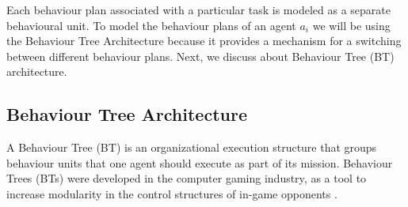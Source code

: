 \documentclass[journal]{IEEEtran}
\theoremstyle{definition}
\newcommand\patrizio[1]{\nb{Patrizio}{#1}}
\begin{document}
Each behaviour plan associated with a particular task is modeled as a separate behavioural unit.
To model the behaviour plans of an agent $a_i$ we will be using the Behaviour Tree Architecture because it provides a mechanism for a switching between different behaviour plans. Next, we discuss about Behaviour Tree (BT) architecture.

\subsection{Behaviour Tree Architecture}

A Behaviour Tree (BT) is an organizational execution structure that groups behaviour units that one agent should execute as part of its mission. Behaviour Trees (BTs) were developed in the computer gaming industry, as a tool to increase modularity in
the control structures of in-game opponents \cite{colledanchise2017behavior}.





\end{document}
